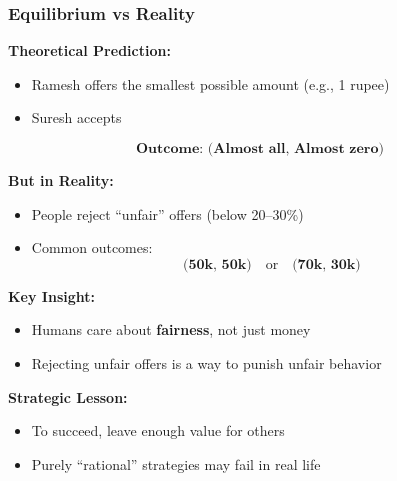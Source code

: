 \begin{frame}[fragile]\frametitle{Equilibrium vs Reality}

\textbf{Theoretical Prediction:}

\begin{itemize}
  \item Ramesh offers the smallest possible amount (e.g., 1 rupee)
  \item Suresh accepts
\end{itemize}

\vspace{6pt}

\[
\textbf{Outcome: (Almost\ all,\ Almost\ zero)}
\]

\vspace{10pt}

\textbf{But in Reality:}

\begin{itemize}
  \item People reject “unfair” offers (below 20–30\%)
  \item Common outcomes:
  \[
  \textbf{(50k,\ 50k)} \quad \text{or} \quad \textbf{(70k,\ 30k)}
  \]
\end{itemize}

\vspace{8pt}

\textbf{Key Insight:}

\begin{itemize}
  \item Humans care about \textbf{fairness}, not just money
  \item Rejecting unfair offers is a way to punish unfair behavior
\end{itemize}

\vspace{6pt}

\textbf{Strategic Lesson:}
\begin{itemize}
  \item To succeed, leave enough value for others
  \item Purely “rational” strategies may fail in real life
\end{itemize}

\end{frame}

